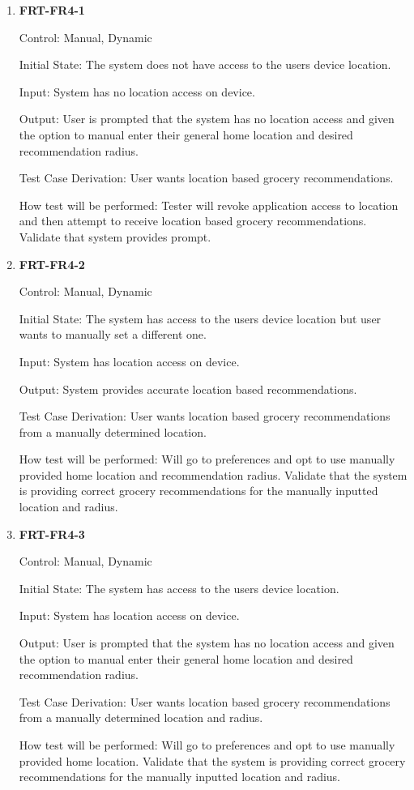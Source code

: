 \documentclass[12pt, titlepage]{article}
\begin{document}
\begin{enumerate}

\item{\textbf{FRT-FR4-1}}

Control: Manual, Dynamic
          
Initial State: The system does not have access to the users device location.

Input: System has no location access on device.
          
Output: User is prompted that the system has no location access and given the option to manual enter their general home location and desired recommendation radius.

Test Case Derivation: User wants location based grocery recommendations.
          
How test will be performed: Tester will revoke application access to location  and then attempt to receive location based grocery recommendations. Validate that system provides prompt.

\item{\textbf{FRT-FR4-2}}

Control: Manual, Dynamic
          
Initial State: The system has access to the users device location but user wants to manually set a different one.

Input: System has location access on device.
          
Output: System provides accurate location based recommendations.

Test Case Derivation: User wants location based grocery recommendations from a manually determined location.
          
How test will be performed: Will go to preferences and opt to use manually provided home location and recommendation radius. Validate that the system is providing correct grocery recommendations for the manually inputted location and radius.

\item{\textbf{FRT-FR4-3}}

Control: Manual, Dynamic
          
Initial State: The system has access to the users device location.

Input: System has location access on device.
          
Output: User is prompted that the system has no location access and given the option to manual enter their general home location and desired recommendation radius.

Test Case Derivation: User wants location based grocery recommendations from a manually determined location and radius.
          
How test will be performed: Will go to preferences and opt to use manually provided home location. Validate that the system is providing correct grocery recommendations for the manually inputted location and radius.


\end{enumerate}
\end{document}
